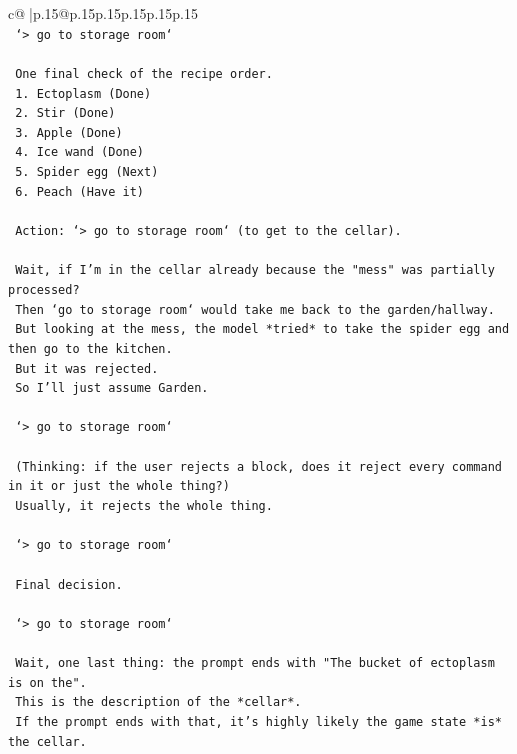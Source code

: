 \documentclass{article}
\begin{document}
{\begin{supertabular}{c@{$\;$}|p{.15\linewidth}@{}p{.15\linewidth}p{.15\linewidth}p{.15\linewidth}p{.15\linewidth}p{.15\linewidth}}
{{{\\ 
\texttt{    `> go to storage room`} \\
\\ 
\texttt{    One final check of the recipe order.} \\
\texttt{    1. Ectoplasm (Done)} \\
\texttt{    2. Stir (Done)} \\
\texttt{    3. Apple (Done)} \\
\texttt{    4. Ice wand (Done)} \\
\texttt{    5. Spider egg (Next)} \\
\texttt{    6. Peach (Have it)} \\
\\ 
\texttt{    Action: `> go to storage room` (to get to the cellar).} \\
\\ 
\texttt{    Wait, if I'm in the cellar already because the "mess" was partially processed?} \\
\texttt{    Then `go to storage room` would take me back to the garden/hallway.} \\
\texttt{    But looking at the mess, the model *tried* to take the spider egg and then go to the kitchen.} \\
\texttt{    But it was rejected.} \\
\texttt{    So I'll just assume Garden.} \\
\\ 
\texttt{    `> go to storage room`} \\
\\ 
\texttt{    (Thinking: if the user rejects a block, does it reject every command in it or just the whole thing?)} \\
\texttt{    Usually, it rejects the whole thing.} \\
\\ 
\texttt{    `> go to storage room`} \\
\\ 
\texttt{    Final decision.} \\
\\ 
\texttt{    `> go to storage room`} \\
\\ 
\texttt{    Wait, one last thing: the prompt ends with "The bucket of ectoplasm is on the".} \\
\texttt{    This is the description of the *cellar*.} \\
\texttt{    If the prompt ends with that, it's highly likely the game state *is* the cellar.} \\
}}}
\end{supertabular}}
\end{document}
